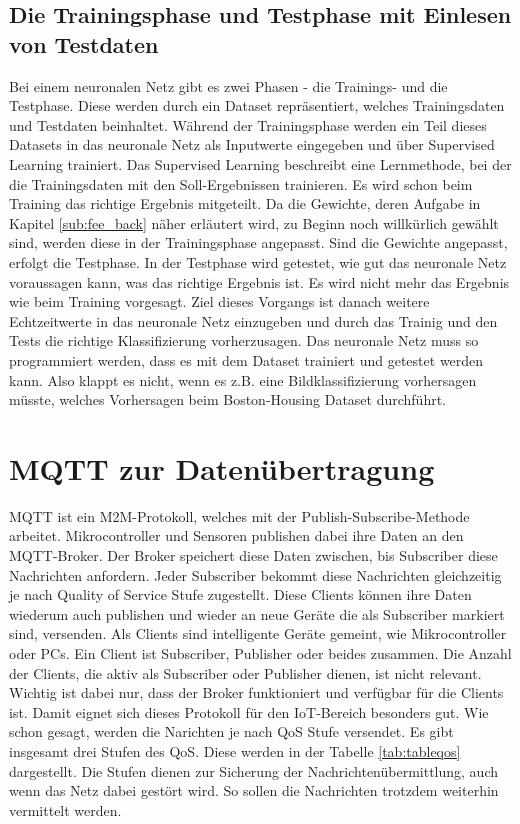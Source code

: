\subsection{Die Trainingsphase und Testphase mit Einlesen von Testdaten}
\label{subsec:eval}
Bei einem neuronalen Netz gibt es zwei Phasen - die Trainings- und die Testphase. Diese werden durch ein Dataset repräsentiert, welches Trainingsdaten und Testdaten beinhaltet. Während der Trainingsphase werden ein Teil dieses Datasets in das neuronale Netz als Inputwerte eingegeben und über Supervised Learning trainiert. Das Supervised Learning beschreibt eine Lernmethode, bei der die Trainingsdaten mit den Soll-Ergebnissen trainieren. Es wird schon beim Training das richtige Ergebnis mitgeteilt. Da die Gewichte, deren Aufgabe in Kapitel \ref{sub:fee_back} näher erläutert wird, zu Beginn noch willkürlich gewählt sind, werden diese in der Trainingsphase angepasst.   
\newline
Sind die Gewichte angepasst, erfolgt die Testphase. In der Testphase wird getestet, wie gut das neuronale Netz voraussagen kann, was das richtige Ergebnis ist. Es wird nicht mehr das Ergebnis wie beim Training vorgesagt. Ziel dieses Vorgangs ist danach weitere Echtzeitwerte in das neuronale Netz einzugeben und  durch das Trainig und den Tests die richtige Klassifizierung vorherzusagen.
\newline
Das neuronale Netz muss so programmiert werden, dass es mit dem Dataset trainiert und getestet werden kann. Also klappt es nicht, wenn es z.B. eine Bildklassifizierung vorhersagen müsste, welches Vorhersagen beim Boston-Housing Dataset durchführt.
 
\section{MQTT zur Datenübertragung}
\label{sec:mqtt}
MQTT ist ein M2M-Protokoll, welches mit der Publish-Subscribe-Methode arbeitet. Mikrocontroller und Sensoren publishen dabei ihre Daten an den MQTT-Broker. Der Broker speichert diese Daten zwischen, bis Subscriber diese Nachrichten anfordern. Jeder Subscriber bekommt diese Nachrichten gleichzeitig je nach Quality of Service Stufe zugestellt. Diese Clients können ihre Daten wiederum auch publishen und wieder an neue Geräte die als Subscriber markiert sind, versenden. Als Clients sind intelligente Geräte gemeint, wie Mikrocontroller oder PCs. Ein Client ist Subscriber, Publisher oder beides zusammen. Die Anzahl der Clients, die aktiv als Subscriber oder Publisher dienen, ist nicht relevant. Wichtig ist dabei nur, dass der Broker funktioniert und verfügbar für die Clients ist.\citep{soni2017survey} Damit eignet sich dieses Protokoll für den IoT-Bereich besonders gut.
\newline
Wie schon gesagt, werden die Narichten je nach QoS Stufe versendet. Es gibt insgesamt drei Stufen des QoS. Diese werden in der Tabelle \ref{tab:tableqos} dargestellt. Die Stufen dienen zur Sicherung der Nachrichtenübermittlung, auch wenn das Netz dabei gestört wird. So sollen die Nachrichten trotzdem weiterhin vermittelt werden.

